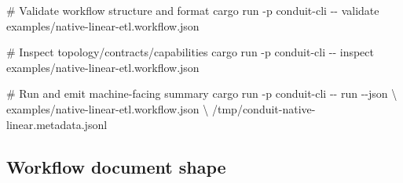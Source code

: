 \documentclass[
  letterpaper,
]{report}
\newenvironment{Shaded}{\begin{snugshade}}{\end{snugshade}}
\newcommand{\AttributeTok}[1]{\textcolor[rgb]{0.40,0.45,0.13}{#1}}
\newcommand{\CommentTok}[1]{\textcolor[rgb]{0.37,0.37,0.37}{#1}}
\newcommand{\DataTypeTok}[1]{\textcolor[rgb]{0.68,0.00,0.00}{#1}}
\newcommand{\ExtensionTok}[1]{\textcolor[rgb]{0.00,0.23,0.31}{#1}}
\newcommand{\NormalTok}[1]{\textcolor[rgb]{0.00,0.23,0.31}{#1}}
\begin{document}
\begin{Shaded}
\begin{Highlighting}[]
\CommentTok{\# Validate workflow structure and format}
\ExtensionTok{cargo}\NormalTok{ run }\AttributeTok{{-}p}\NormalTok{ conduit{-}cli }\AttributeTok{{-}{-}}\NormalTok{ validate examples/native{-}linear{-}etl.workflow.json}

\CommentTok{\# Inspect topology/contracts/capabilities}
\ExtensionTok{cargo}\NormalTok{ run }\AttributeTok{{-}p}\NormalTok{ conduit{-}cli }\AttributeTok{{-}{-}}\NormalTok{ inspect examples/native{-}linear{-}etl.workflow.json}

\CommentTok{\# Run and emit machine{-}facing summary}
\ExtensionTok{cargo}\NormalTok{ run }\AttributeTok{{-}p}\NormalTok{ conduit{-}cli }\AttributeTok{{-}{-}}\NormalTok{ run }\AttributeTok{{-}{-}json} \DataTypeTok{\textbackslash{}}
\NormalTok{  examples/native{-}linear{-}etl.workflow.json }\DataTypeTok{\textbackslash{}}
\NormalTok{  /tmp/conduit{-}native{-}linear.metadata.jsonl}
\end{Highlighting}
\end{Shaded}

\subsection{Workflow document shape}\label{workflow-document-shape}
\end{document}
